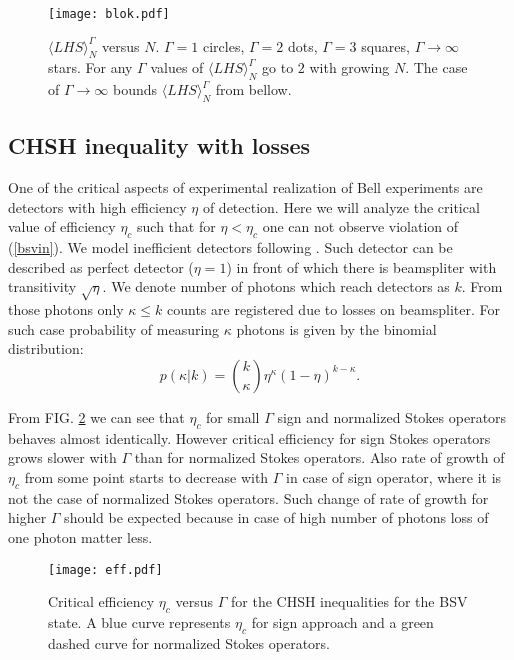 \documentclass[aps,pra, twocolumn, showpacs]{revtex4-2}
\begin{document}
\begin{figure}[h!]
\centering
\texttt{[image: blok.pdf]} 
\caption{$\langle LHS \rangle_N^\Gamma$ versus $N$. $\Gamma=1$ circles, $\Gamma=2$ dots, $\Gamma=3$ squares, $\Gamma\rightarrow\infty$ stars. For any $\Gamma$ values of $\langle LHS \rangle_N^\Gamma$ go to $2$ with growing $N$. The case of $\Gamma\rightarrow\infty$ bounds $\langle LHS \rangle_N^\Gamma$ from bellow.}
\label{blok}
\end{figure}
\subsection{CHSH inequality with losses} \label{losses}
One of the critical aspects of experimental realization of Bell experiments are detectors with high efficiency $\eta$ of detection. Here we will analyze the critical value of efficiency $\eta_{c}$ such that for $\eta<\eta_{c}$ one can not observe violation of (\ref{bsvin}). We model inefficient detectors following \cite{ZUKUBELL}. Such detector can be described as perfect detector ($\eta=1$) in front of which there is beamspliter with transitivity  $\sqrt{\eta}$.  We denote number of photons which reach detectors as $k$. From those photons only $\kappa\leq k$ counts are registered due to losses on beamspliter. For such case probability of measuring $\kappa$ photons is given by the binomial distribution:
\begin{equation}
p(\kappa|k)= {k\choose \kappa}\eta^{\kappa}(1-\eta)^{k-\kappa}.
\end{equation}



From FIG. \ref{effbsv} we can see that $\eta_c$ for small $\Gamma$ sign and normalized Stokes operators behaves almost identically. However critical efficiency for sign Stokes operators grows slower with $\Gamma$ than for normalized Stokes operators. Also rate of growth of $\eta_c$ from some point starts to decrease with $\Gamma$ in case of sign operator, where it is not the case of normalized Stokes operators. Such change of rate of growth for higher $\Gamma$ should be expected because in case of high number of photons loss of one photon matter less.   
\begin{figure}[h!]
\centering
\texttt{[image: eff.pdf]} 
\caption{Critical efficiency $\eta_c$ versus $\Gamma$ for the CHSH inequalities for the BSV state. A blue curve represents $\eta_c$ for sign approach and a green dashed curve for normalized Stokes operators. }
\label{effbsv}
\end{figure}
\end{document}
